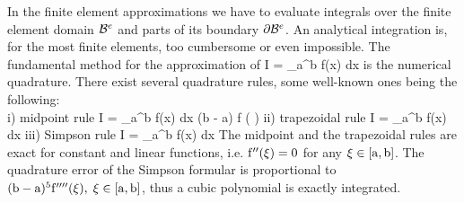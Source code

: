 In the finite element approximations we have to evaluate integrals over the 
finite element domain ${\cal B}^e$ and parts of its boundary $\partial {\cal B}^e$. 
An analytical integration is, for the most finite elements, too cumbersome or
even impossible. The fundamental method for the approximation of
\eb
\rm
I = \int_a^b f(x) \; dx
\label{intonederkl}
\ee
is the numerical quadrature. There exist several quadrature rules, 
some well-known ones being the following: \\
i) midpoint rule
\eb
\rm
I = \int_a^b f(x) dx \approx (b - a) \; f \displaystyle \left(  \right)
\ee
ii) trapezoidal rule
\eb
\rm
I = \int_a^b f(x) dx \approx {} \; [f(a) + f(b)]
\ee
iii) Simpson rule
\eb
\rm
I = \int_a^b f(x) dx \approx {} 
\ee
The midpoint and the trapezoidal rules are exact for constant and linear functions, i.e.
$\rm f''(\xi) = 0$ for any $\rm \xi \in [a,b]$. The quadrature error of the Simpson
formular is proportional to $\rm (b-a)^5 f''''(\xi), \; \xi \in [a,b]$, thus a cubic polynomial
is exactly integrated.

